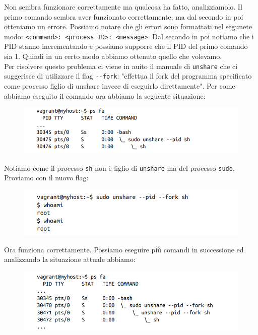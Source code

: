Non sembra funzionare correttamente ma qualcosa ha fatto, analizziamolo.
Il primo comando sembra aver funzionato correttamente, ma dal secondo in poi
otteniamo un errore. Possiamo notare che gli errori sono formattati nel segunete modo:
\verb|<command>: <process ID>: <message>|. Dal secondo in poi notiamo che i PID
stanno incrementando e possiamo supporre che il PID del primo comando sia 1. Quindi
in un certo modo abbiamo ottenuto quello che volevamo.\\
Per risolvere questo problema ci viene in auito il manuale di \verb|unshare| che ci
suggerisce di utilizzare il flag \verb|--fork|: "effettua il fork del programma
specificato come processo figlio di unshare invece di eseguirlo direttamente".
Per come abbiamo eseguito il comando ora abbiamo la seguente situazione:

\begin{figure}[H]
    \centering
    \includegraphics[width=12cm, keepaspectratio]{capitoli/os_security/imgs/pid2.png}
\end{figure}

Notiamo come il processo \verb|sh| non è figlio di \verb|unshare| ma del processo
\verb|sudo|.\\

Proviamo con il nuovo flag:

\begin{figure}[H]
    \centering
    \includegraphics[width=12cm, keepaspectratio]{capitoli/os_security/imgs/pid3.png}
\end{figure}

Ora funziona correttamente. Possiamo eseguire più comandi in successione ed
analizzando la situazione attuale abbiamo:

\begin{figure}[H]
    \centering
    \includegraphics[width=12cm, keepaspectratio]{capitoli/os_security/imgs/pid4.png}
\end{figure}

